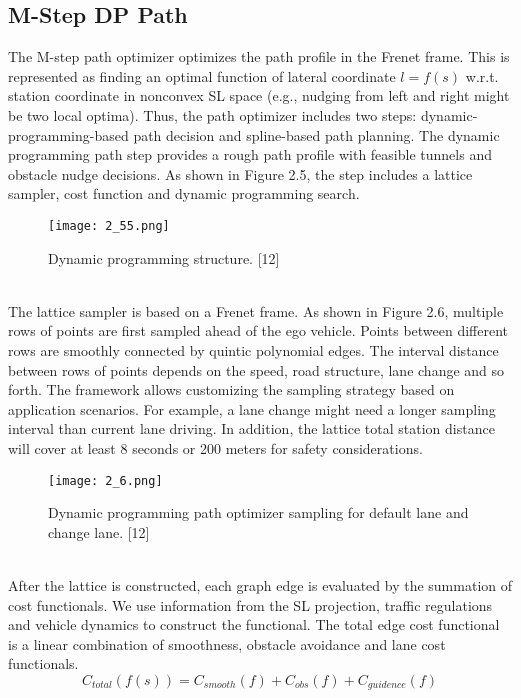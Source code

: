 \documentclass{thesisreport}
\begin{document}
 \subsection{M-Step DP Path}
 The M-step path optimizer optimizes the path profile in the Frenet frame. This is represented as finding an optimal function of lateral coordinate $l = f(s)$ w.r.t. station coordinate in nonconvex SL space (e.g., nudging from left and right might be two local optima). Thus, the path optimizer includes two steps: dynamic-programming-based path decision and spline-based path planning. The dynamic
 programming path step provides a rough path profile with feasible tunnels and obstacle nudge decisions. As shown in Figure 2.5, the step includes a lattice sampler, cost function and dynamic programming search.
   \begin{figure}[ht]
 	\centering
 	\texttt{[image: 2\_55.png]}
 	\caption{Dynamic programming structure. [12]}
 	\label{fig:2.5} 
 \end{figure} \\
\indent
The lattice sampler is based on a Frenet frame. As shown in Figure 2.6, multiple rows of points are first sampled ahead of the ego vehicle. Points between different rows are smoothly connected by quintic polynomial edges. The interval distance between rows of points depends on the speed, road structure, lane change and so forth. The framework allows customizing the sampling strategy based on application scenarios. For example, a lane change might need a longer sampling interval than current lane driving. In addition, the lattice total station distance will cover at least 8 seconds or 200 meters for safety considerations.
   \begin{figure}[ht]
	\centering
	\texttt{[image: 2\_6.png]}
	\caption{Dynamic programming path optimizer sampling for default lane and change lane. [12]}
	\label{fig:2.6} 
\end{figure} \\
\indent
After the lattice is constructed, each graph edge is evaluated by the summation of cost functionals. We use information from the SL projection, traffic regulations and vehicle dynamics to construct the functional. The total edge cost functional is a linear combination of smoothness, obstacle avoidance and lane cost functionals.
\begin{equation}
C_{total}(f(s)) = C_{smooth}(f) + C_{obs}(f)+ C_{guidence}(f)
\end{equation}\\
\end{document}
